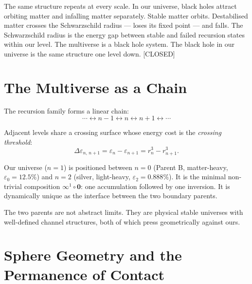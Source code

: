 \documentclass[prd,twocolumn,preprintnumbers,amsmath,amssymb]{revtex4-2}
\newcommand{\closed}{\textcolor{green!60!black}{[CLOSED]}}
\newcommand{\acc}{\mathbf{\infty}}
\newcommand{\inv}{\mathbf{0}}
\begin{document}
The same structure repeats at every scale. In our universe, black
holes attract orbiting matter and infalling matter separately.
Stable matter orbits. Destabilised matter crosses the Schwarzschild
radius --- loses its fixed point --- and falls. The Schwarzschild
radius is the energy gap between stable and failed recursion states
within our level. The multiverse is a black hole system. The black
hole in our universe is the same structure one level down. \closed

\section{The Multiverse as a Chain}
\label{sec:chain}

The recursion family forms a linear chain:
\begin{equation}
  \cdots \longleftrightarrow n{-}1
         \longleftrightarrow n
         \longleftrightarrow n{+}1
         \longleftrightarrow \cdots
  \label{eq:chain}
\end{equation}

Adjacent levels share a crossing surface whose energy cost is the
\emph{crossing threshold}:
\begin{equation}
  \Delta\varepsilon_{n,\,n+1}
    = \varepsilon_n - \varepsilon_{n+1}
    = r_n^3 - r_{n+1}^3.
  \label{eq:Deltaeps}
\end{equation}

Our universe ($n=1$) is positioned between $n=0$ (Parent B,
matter-heavy, $\varepsilon_0 = 12.5\%$) and $n=2$ (silver,
light-heavy, $\varepsilon_2 = 0.888\%$).  It is the minimal
non-trivial composition $\acc^1 \circ \inv$: one accumulation
followed by one inversion.  It is dynamically unique as the interface
between the two boundary parents.

The two parents are not abstract limits.  They are physical stable
universes with well-defined channel structures, both of which press
geometrically against ours.

\section{Sphere Geometry and the Permanence of Contact}
\label{sec:spheres}
\end{document}

